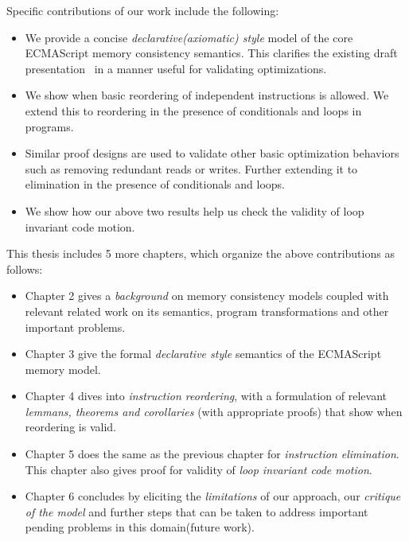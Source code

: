 Specific contributions of our work include the following:
\begin{itemize}
    \item We provide a concise \textit{declarative(axiomatic) style} model of the core ECMAScript memory consistency semantics. This clarifies the existing draft presentation~\cite{ECMA} in a manner useful for validating optimizations.
    \item We show when basic reordering of independent instructions is allowed. We extend this to reordering in the presence of conditionals and loops in programs.
    \item Similar proof designs are used to validate other basic optimization behaviors such as removing redundant reads or writes. Further extending it to elimination in the presence of conditionals and loops. 
    \item We show how our above two results help us check the validity of loop invariant code motion. 
\end{itemize}

This thesis includes 5 more chapters, which organize the above contributions as follows:
\begin{itemize}
    \item Chapter 2 gives a \textit{background} on memory consistency models coupled with relevant related work on its semantics, program transformations and other important problems.
    \item Chapter 3 give the formal \textit{declarative style} semantics of the ECMAScript memory model.
    \item Chapter 4 dives into \textit{instruction reordering}, with a formulation of relevant \textit{lemmans, theorems and corollaries} (with appropriate proofs) that show when reordering is valid.
    \item Chapter 5 does the same as the previous chapter for \textit{instruction elimination}. This chapter also gives proof for validity of \textit{loop invariant code motion}. 
    \item Chapter 6 concludes by eliciting the \textit{limitations} of our approach, our \textit{critique of the model} and further steps that can be taken to address important pending problems in this domain(future work).
\end{itemize}